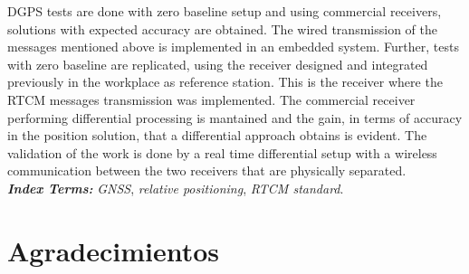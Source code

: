 \documentclass[a4paper,12pt,oneside,onecolumn,final,openright]{book}%
\begin{document}
	DGPS tests are done with zero baseline setup and using commercial receivers, solutions with expected accuracy are obtained. The wired transmission of the messages mentioned above is implemented in an embedded system. Further, tests with zero baseline are replicated, using the receiver designed and integrated previously in the workplace as reference station. This is the receiver where the RTCM messages transmission was implemented. The commercial receiver performing differential processing is mantained and the gain, in terms of accuracy in the position solution, that a differential approach obtains is evident. The validation of the work is done by a real time differential setup with a wireless communication between the two receivers that are physically separated.\\
\textbf{\textit{Index Terms:}} \textit{GNSS}, \textit{relative positioning}, \textit{RTCM standard}.\newpage
\chapter*{Agradecimientos}
%
%
%
\newpage
\end{document}
